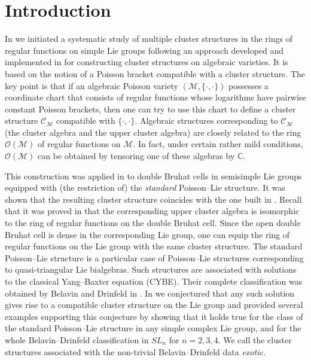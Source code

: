 \documentclass{amsart}
\theoremstyle{definition}
\theoremstyle{remark}
\numberwithin{equation}{section}
\numberwithin{theorem}{section}
\begin{document}
\section{Introduction}
In \cite{GSVMMJ} we initiated a systematic study of
multiple cluster structures in the rings of regular functions
on simple Lie groups following an approach developed and implemented 
in \cite{GSV1, GSV5, GSVb} 
for constructing cluster structures 
on algebraic varieties. It is based on the notion of a Poisson bracket compatible with a cluster structure. The key point is that if an algebraic 
Poisson variety $\left ( \mathcal{M}, {{\{\cdot,\cdot\}}}\right )$ possesses a  coordinate chart
that consists of regular functions whose logarithms have pairwise constant Poisson brackets, 
then one can try to use this chart to define a cluster structure ${{\mathcal C}}_{{\mathcal M}}$ compatible with ${{\{\cdot,\cdot\}}}$. Algebraic 
structures corresponding to ${{\mathcal C}}_{{\mathcal M}}$ (the cluster algebra and the upper cluster algebra)
are closely related 
to the ring ${{\mathcal O}}({{\mathcal M}})$ of regular functions on $\mathcal{M}$. 
In fact, under certain rather mild conditions, ${{\mathcal O}}({{\mathcal M}})$ can be obtained by tensoring one of these
algebras by ${{\mathbb C}}$.

This construction was applied in \cite[Ch.~4.3]{GSVb} to double Bruhat cells in semisimple Lie groups
equipped with (the restriction of) the {\em standard\/} Poisson--Lie structure. It was shown that
the resulting cluster structure coincides with the one built in \cite{CAIII}. Recall that it was proved in
\cite{CAIII} that the corresponding upper cluster algebra is isomorphic to the ring of regular functions on 
the double Bruhat cell. Since the open double Bruhat cell is dense in the corresponding Lie group, 
one can equip  the ring of regular 
functions on the Lie group with the same cluster structure. 
The standard Poisson--Lie structure is a particular case of Poisson--Lie structures corresponding to quasi-triangular
Lie bialgebras. Such structures are associated with solutions to the classical Yang--Baxter equation (CYBE).
Their complete classification was obtained by Belavin and Drinfeld in \cite{BD}. In \cite{GSVMMJ} we conjectured that any such solution
 gives rise to a compatible cluster structure on the Lie group
 and provided several examples supporting this conjecture by showing that it holds true for the class of the standard Poisson--Lie
  structure in any simple complex Lie group, and for 
 the whole Belavin--Drinfeld classification in $SL_n$ for $n=2,3,4$.  We call the cluster structures
 associated with the non-trivial Belavin--Drinfeld data {\it exotic}.
\end{document}
